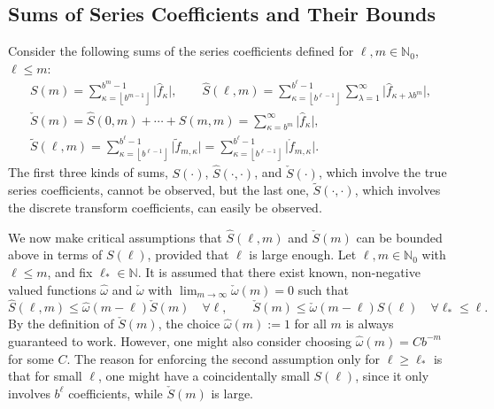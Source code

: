 \documentclass[graybox,footinfo]{svmult}
\newcommand{\naturals}{\mathbb{N}} %
\newcommand{\natzero}{\mathbb{N}_{0}}
\newcommand{\hf}{\hat{f}}
\newcommand{\tf}{\tilde{f}}
\newcommand{\rf}{\mathring{f}}
\newcommand{\bigabs}[1]{\ensuremath{\bigl \lvert #1 \bigr \rvert}}
\newcommand{\hS}{\widehat{S}}
\newcommand{\wcS}{\check{S}}
\newcommand{\tS}{\widetilde{S}}
\newcommand{\homega}{\widehat{\omega}}
\newcommand{\wcomega}{\check{\omega}}
\begin{document}
\subsection{Sums of Series Coefficients and Their Bounds}
Consider the following sums of the series coefficients defined for $\ell,m \in \natzero$, $\ell \le m$:
\begin{gather*}
S(m) =  \sum_{\kappa=\left \lfloor b^{m-1} \right \rfloor}^{b^{m}-1} \bigabs{\hf_{\kappa}}, \qquad
\hS(\ell,m)  = \sum_{\kappa=\left \lfloor b^{\ell-1} \right \rfloor}^{b^{\ell}-1} \sum_{\lambda=1}^{\infty} \bigabs{ \hf_{\kappa+\lambda b^{m}}}, \\
\wcS(m)=\hS(0,m) + \cdots + \hS(m,m)=
\sum_{\kappa=b^{m}}^{\infty} \bigabs{\hf_{\kappa}}, \\
\tS(\ell,m) = \sum_{\kappa=\left \lfloor b^{\ell-1}\right \rfloor}^{b^{\ell}-1} \bigabs{\tf_{m,\kappa}} = \sum_{\kappa=\left \lfloor b^{\ell-1}\right \rfloor}^{b^{\ell}-1} \bigabs{\rf_{m,\kappa}}.
\end{gather*}
The first three kinds of sums, $S(\cdot)$, $\hS(\cdot,\cdot)$, and $\wcS(\cdot)$, which involve the true series coefficients, cannot be observed, but the last one, $\tS(\cdot, \cdot)$, which involves the discrete transform coefficients, can easily be observed.

We now make critical assumptions that $\hS(\ell,m)$ and $\wcS(m)$ can be bounded above in terms of $S(\ell)$, provided that $\ell$ is large enough.  Let $\ell,m \in \naturals_0$ with $\ell \le m$, and fix $\ell_* \in \naturals$.  It is assumed that there exist known,  non-negative valued functions $\homega$ and $\wcomega$ with $\lim_{m \to \infty} \wcomega(m) = 0$ such that
\begin{equation} \label{conecond}
\hS(\ell,m) \le \homega(m-\ell) \wcS(m) \quad \forall \ell, \qquad
\wcS(m) \le \wcomega(m-\ell) S(\ell) \quad \forall \ell_* \le \ell.
\end{equation}
By the definition of $\wcS(m)$, the choice $\homega(m):=1$ for all $m$ is always guaranteed to work.  However, one might also consider choosing $\homega(m)=C b^{-m}$ for some $C$.  The reason for enforcing the second assumption only  for $\ell \ge \ell_*$ is that for small $\ell$, one might have a coincidentally small $S(\ell)$, since it only involves $b^\ell$ coefficients, while $\wcS(m)$ is large.
\end{document}
